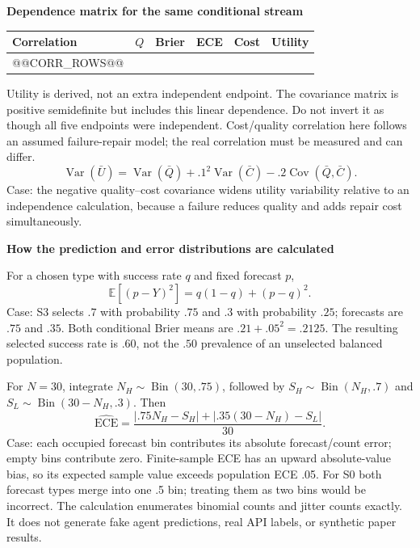 \documentclass[10pt,a4paper]{article}
\newcommand{\lead}[1]{\vspace{3pt}\textbf{#1}\par}
\begin{document}
\lead{Dependence matrix for the same conditional stream}
\begin{center}\small
\begin{tabular*}{\linewidth}{@{\extracolsep{\fill}}lrrrrr@{}}\toprule
Correlation & $Q$ & Brier & ECE & Cost & Utility\\\midrule
@@CORR_ROWS@@
\bottomrule\end{tabular*}\end{center}
Utility is derived, not an extra independent endpoint. The covariance matrix
is positive semidefinite but includes this linear dependence. Do not invert
it as though all five endpoints were independent. Cost/quality correlation
here follows an assumed failure-repair model; the real correlation must be
measured and can differ.
\[
 \operatorname{Var}(\bar U)=\operatorname{Var}(\bar Q)
 +.1^2\operatorname{Var}(\bar C)-.2\operatorname{Cov}(\bar Q,\bar C).
\]
Case: the negative quality--cost covariance widens utility variability relative
to an independence calculation, because a failure reduces quality and adds
repair cost simultaneously.

\lead{How the prediction and error distributions are calculated}
For a chosen type with success rate $q$ and fixed forecast $p$,
\[
 \mathbb E[(p-Y)^2]=q(1-q)+(p-q)^2.
\]
Case: S3 selects $.7$ with probability $.75$ and $.3$ with probability $.25$;
forecasts are $.75$ and $.35$. Both conditional Brier means are
$.21+.05^2=.2125$. The resulting selected success rate is $.60$, not the
$.50$ prevalence of an unselected balanced population.

For $N=30$, integrate $N_H\sim\operatorname{Bin}(30,.75)$, followed by
$S_H\sim\operatorname{Bin}(N_H,.7)$ and
$S_L\sim\operatorname{Bin}(30-N_H,.3)$. Then
\[
 \widehat{\mathrm{ECE}}=
 \frac{|.75N_H-S_H|+|.35(30-N_H)-S_L|}{30}.
\]
Case: each occupied forecast bin contributes its absolute forecast/count error;
empty bins contribute zero. Finite-sample ECE has an upward absolute-value bias,
so its expected sample value exceeds population ECE .05. For S0 both forecast
types merge into one .5 bin; treating them as two bins would be incorrect.
The calculation enumerates binomial counts and jitter counts exactly. It does
not generate fake agent predictions, real API labels, or synthetic paper results.
\end{document}

